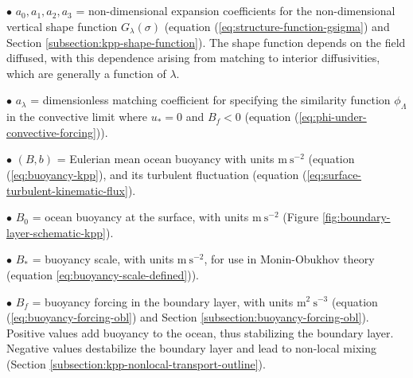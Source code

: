 \subsection*{}

\begin{mdframed}[backgroundcolor=lightgray!50]

\vspace{.1cm}
\begin{trivlist}

\item[$\bullet$] $a_{0}, a_{1}, a_{2}, a_{3}$ = non-dimensional
  expansion coefficients for the non-dimensional vertical shape
  function $G_{\lambda}(\sigma)$ (equation
  (\ref{eq:structure-function-gsigma}) and Section
  \ref{subsection:kpp-shape-function}).  The shape function depends on
  the field diffused, with this dependence arising from matching to
  interior diffusivities, which are generally a function of $\lambda$.

\item[$\bullet$] $a_{\lambda}$ = dimensionless matching coefficient
  for specifying the similarity function $\phi_{\Lambda}$ in the
  convective limit where $u_{*} = 0$ and $B_{f} < 0$ (equation
  (\ref{eq:phi-under-convective-forcing})).

\item[$\bullet$] $(B,b)$ = Eulerian mean ocean buoyancy with units
  $\mbox{m}~\mbox{s}^{-2}$ (equation (\ref{eq:buoyancy-kpp}), and its
  turbulent fluctuation (equation
  (\ref{eq:surface-turbulent-kinematic-flux}).

\item[$\bullet$] $B_{0}$ = ocean buoyancy at the surface, with units
  $\mbox{m}~\mbox{s}^{-2}$ (Figure
  \ref{fig:boundary-layer-schematic-kpp}).

\item[$\bullet$] $B_{*}$ = buoyancy scale, with units
  $\mbox{m}~\mbox{s}^{-2}$, for use in Monin-Obukhov theory (equation
  \ref{eq:buoyancy-scale-defined})).

\item[$\bullet$] $B_{f}$ = buoyancy forcing in the boundary layer,
  with units $\mbox{m}^{2}~\mbox{s}^{-3}$ (equation
  (\ref{eq:buoyancy-forcing-obl}) and Section
  \ref{subsection:buoyancy-forcing-obl}).  Positive values add
  buoyancy to the ocean, thus stabilizing the boundary layer.
  Negative values destabilize the boundary layer and lead to non-local
  mixing (Section \ref{subsection:kpp-nonlocal-transport-outline}).


\end{trivlist}
\end{mdframed}
